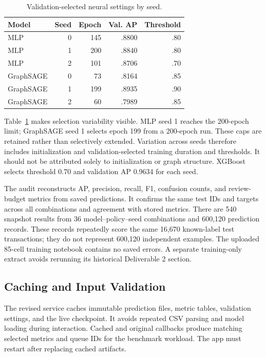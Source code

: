 \documentclass[conference]{IEEEtran}
\begin{document}
\begin{table}[t]\caption{Validation-selected neural settings by seed.}\centering\small
\begin{tabular}{lrrrr}\toprule
Model & Seed & Epoch & Val. AP & Threshold\\\midrule
MLP & 0 & 145 & .8800 & .80\\
MLP & 1 & 200 & .8840 & .80\\
MLP & 2 & 101 & .8706 & .70\\
GraphSAGE & 0 & 73 & .8164 & .85\\
GraphSAGE & 1 & 199 & .8935 & .90\\
GraphSAGE & 2 & 60 & .7989 & .85\\\bottomrule
\end{tabular}\label{tab:settings}\end{table}

Table~\ref{tab:settings} makes selection variability visible. MLP seed 1 reaches the 200-epoch limit; GraphSAGE seed 1 selects epoch 199 from a 200-epoch run. These caps are retained rather than selectively extended. Variation across seeds therefore includes initialization and validation-selected training duration and thresholds. It should not be attributed solely to initialization or graph structure. XGBoost selects threshold 0.70 and validation AP 0.9634 for each seed.

The audit reconstructs AP, precision, recall, F1, confusion counts, and review-budget metrics from saved predictions. It confirms the same test IDs and targets across all combinations and agreement with stored metrics. There are 540 snapshot results from 36 model--policy--seed combinations and 600,120 prediction records. These records repeatedly score the same 16,670 known-label test transactions; they do not represent 600,120 independent examples. The uploaded 85-cell training notebook contains no saved errors. A separate training-only extract avoids rerunning its historical Deliverable 2 section.

\subsection{Caching and Input Validation}
The revised service caches immutable prediction files, metric tables, validation settings, and the live checkpoint. It avoids repeated CSV parsing and model loading during interaction. Cached and original callbacks produce matching selected metrics and queue IDs for the benchmark workload. The app must restart after replacing cached artifacts.
\end{document}

